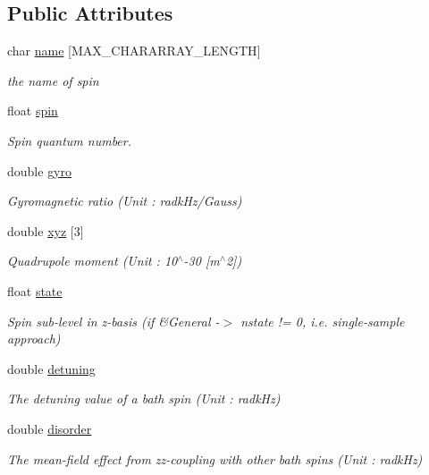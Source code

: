 \subsection*{Public Attributes}
\begin{DoxyCompactItemize}
\item 
char \hyperlink{structBathSpin_a2158c37aefcd8093520106945f5f7463}{name} \mbox{[}M\-A\-X\-\_\-\-C\-H\-A\-R\-A\-R\-R\-A\-Y\-\_\-\-L\-E\-N\-G\-T\-H\mbox{]}
\begin{DoxyCompactList}\small\item\em the name of spin \end{DoxyCompactList}\item 
float \hyperlink{structBathSpin_a0738a356e1f78530032d8bc8de02fbd8}{spin}
\begin{DoxyCompactList}\small\item\em Spin quantum number. \end{DoxyCompactList}\item 
double \hyperlink{structBathSpin_a8c6487e73c2ef39b7a12d293ff5a1e4d}{gyro}
\begin{DoxyCompactList}\small\item\em Gyromagnetic ratio (Unit \-: radk\-Hz/\-Gauss) \end{DoxyCompactList}\item 
double \hyperlink{structBathSpin_ae88f65d01b379916181269efa6c33e8a}{xyz} \mbox{[}3\mbox{]}
\begin{DoxyCompactList}\small\item\em Quadrupole moment (Unit \-: 10$^\wedge$-\/30 \mbox{[}m$^\wedge$2\mbox{]}) \end{DoxyCompactList}\item 
float \hyperlink{structBathSpin_a6348f965fe820b03094f4c620ab7ffe0}{state}
\begin{DoxyCompactList}\small\item\em Spin sub-\/level in z-\/basis (if \&General -\/$>$ nstate != 0, i.\-e. single-\/sample approach) \end{DoxyCompactList}\item 
double \hyperlink{structBathSpin_a045005fcc1f5517a81e47e4a8b30e2f4}{detuning}
\begin{DoxyCompactList}\small\item\em The detuning value of a bath spin (Unit \-: radk\-Hz) \end{DoxyCompactList}\item 
double \hyperlink{structBathSpin_aad59ec954d15643047790f148dcca39b}{disorder}
\begin{DoxyCompactList}\small\item\em The mean-\/field effect from zz-\/coupling with other bath spins (Unit \-: radk\-Hz) \end{DoxyCompactList}\item 

\end{DoxyCompactItemize}
